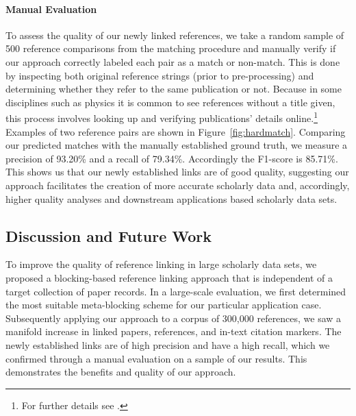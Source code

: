 \paragraph{Manual Evaluation}
To assess the quality of our newly linked references, we take a random sample of 500 reference comparisons from the matching procedure and manually verify if our approach correctly labeled each pair as a match or non-match. This is done by inspecting both original reference strings (prior to pre-processing) and determining whether they refer to the same publication or not. Because in some disciplines such as physics it is common to see references without a title given, this process involves looking up and verifying publications' details online.\footnote{For further details see .} Examples of two reference pairs are shown in Figure~\ref{fig:hardmatch}. Comparing our predicted matches with the manually established ground truth, we measure a precision of 93.20\% and a recall of 79.34\%. Accordingly the F1-score is 85.71\%.
This shows us that our newly established links are of good quality, suggesting our approach facilitates the creation of more accurate scholarly data and, accordingly, higher quality analyses and downstream applications based scholarly data sets.

\subsection{Discussion and Future Work}
To improve the quality of reference linking in large scholarly data sets, we proposed a blocking-based reference linking approach that is independent of a target collection of paper records. In a large-scale evaluation, we first determined the most suitable meta-blocking scheme for our particular application case. Subsequently applying our approach to a corpus of 300,000 references, we saw a manifold increase in linked papers, references, and in-text citation markers. The newly established links are of high precision and have a high recall, which we confirmed through a manual evaluation on a sample of our results. This demonstrates the benefits and quality of our approach.

